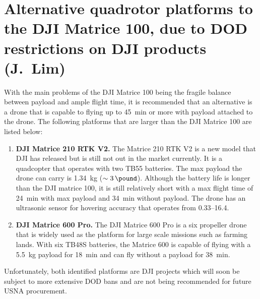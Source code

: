 \section{Alternative quadrotor platforms to the DJI Matrice 100, due to DOD restrictions on DJI products (J.~Lim)}
\label{sec:alternativequads}

With the main problems of the DJI Matrice 100 being the fragile balance between payload and ample flight time, it is recommended that an alternative is a drone that is capable to flying up to \SI{45}{\minute} or more with payload attached to the drone. The following platforms that are larger than the DJI Matrice 100 are listed below:
\begin{enumerate}
\item \textbf{DJI Matrice 210 RTK V2.} The Matrice 210 RTK V2 is a new model that DJI has released but is still not out in the market currently. It is a quadcopter that operates with two TB55 batteries. The max payload the drone can carry is \SI{1.34}{\kilo\gram} ($\sim\SI{3}{\pound}$). Although the battery life is longer than the DJI matrice 100, it is still relatively short with a max flight time of \SI{24}{\minute} with max payload and \SI{34}{\minute} without payload. The drone has an ultrasonic sensor for hovering accuracy that operates from \SIrange{0.33}{16.4}{\foot}. 

\item \textbf{DJI Matrice 600 Pro.} The DJI Matrice 600 Pro is a six propeller drone that is widely used as the platform for large scale missions such as farming lands. With six TB48S batteries, the Matrice 600 is capable of flying with a \SI{5.5}{\kilo\gram} payload for \SI{18}{\minute} and can fly without a payload for \SI{38}{\minute}.
\end{enumerate}

Unfortunately, both identified platforms are DJI projects which will soon be subject to more extensive DOD bans and are not being recommended for future USNA procurement. 